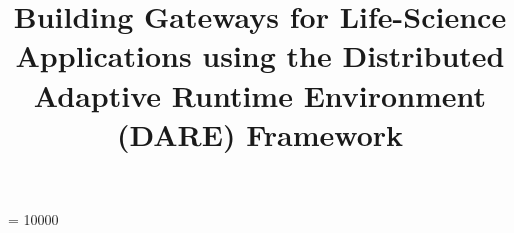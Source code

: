 \documentclass{sig-alternate}
\begin{document}
 {}
\crdata{}
\widowpenalty = 10000



\newif\ifdraft
\drafttrue                                                                                                   

\ifdraft
 \newcommand{\jkimnote}[1]{{\textcolor{green}   { ***Joohyun:   #1 }}}
 \newcommand{\jhanote}[1]{  {\textcolor{red}     { ***SJ: #1 }}}
  \newcommand{\smnote}[1]{  {\textcolor{red}     { ***Sharath: #1 }}}
 \newcommand{\todo}[1]{  {\textcolor{red}     { ***TODO: #1 }}}
 \newcommand{\fix}[1]{  {\textcolor{red}     { ***FIX: #1 }}}
 \newcommand{\reviewer}[1]{}
\else
 \newcommand{\reviewer}[1]{}
 \newcommand{\jkimnote}[1]{}
 \newcommand{\smnote}[1]{}
 \newcommand{\jhanote}[1]{}
 \newcommand{\todo}[1]{  {\textcolor{red}     { ***TODO: #1 }}}
 \newcommand{\fix}[1]{}                                                                                     
\fi

\title{Building Gateways for Life-Science Applications using the
  Distributed Adaptive Runtime Environment (DARE) Framework}

%
%
%
%
%
\end{document}
